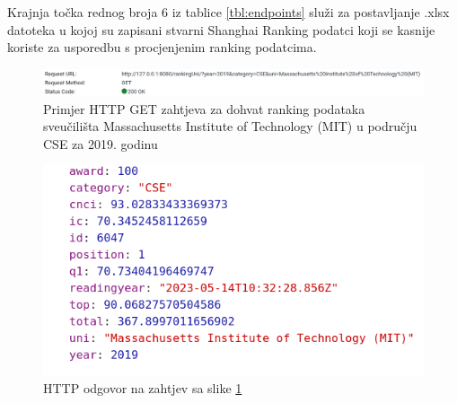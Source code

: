 \documentclass[times, utf8, zavrsni]{fer}
\begin{document}
Krajnja točka rednog broja 6 iz tablice \ref{tbl:endpoints} služi za postavljanje .xlsx datoteka u kojoj su zapisani stvarni Shanghai Ranking podatci 
koji se kasnije koriste za usporedbu s procjenjenim ranking podatcima.\\
\begin{figure}[htb]
    \centering
       \includegraphics[scale=0.36]{get1.png} 
       \caption{Primjer HTTP GET zahtjeva za dohvat ranking podataka sveučilišta Massachusetts Institute of Technology (MIT) u području CSE za 2019. godinu}
       \label{fig:get1}
       \end{figure}
\begin{figure}[htb]
        \centering
           \includegraphics[scale=0.4]{get2.png} 
           \caption{HTTP odgovor na zahtjev sa slike \ref{fig:get1}}
           \label{fig:get2}
           \end{figure}
\end{document}
